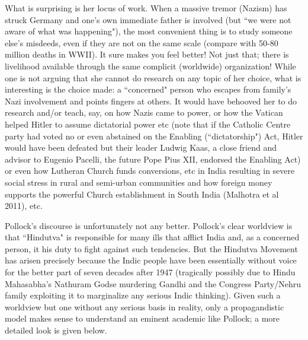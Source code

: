 What is surprising is her locus of work. When a massive tremor (Nazism) has struck Germany and one's own immediate father is involved (but ``we were not aware of what was happening"), the most convenient thing is to study someone else's misdeeds, even if they are not on the same scale (compare with 50-80 million deaths in WWII). It sure makes you feel better! Not just that; there is livelihood available through the same complicit (worldwide) organization! While one is not arguing that she cannot do research on any topic of her choice, what is interesting is the choice made: a ``concerned" person who escapes from family’s Nazi involvement and points fingers at others. It would have behooved her to do research and/or teach, say, on how Nazis came to power, or how the Vatican helped Hitler to assume dictatorial power etc (note that if the Catholic Centre party had voted no or even abstained on the Enabling (``dictatorship") Act, Hitler would have been defeated but their leader Ludwig Kaas, a close friend and advisor to Eugenio Pacelli, the future Pope Pius XII, endorsed the Enabling Act) or even how Lutheran Church funds conversions, etc in India resulting in severe social stress in rural and semi-urban communities and how foreign money supports the powerful Church establishment in South India (Malhotra et al 2011), etc. 

Pollock's discourse is unfortunately not any better. Pollock's clear worldview is that ``Hindutva" is responsible for many ills that afflict India and, as a concerned person, it his duty to fight against such tendencies. But the Hindutva Movement has arisen precisely because the Indic people have been essentially without voice for the better part of seven decades after 1947 (tragically possibly due to Hindu Mahasabha’s Nathuram Godse murdering Gandhi and the Congress Party/Nehru family exploiting it to marginalize any serious Indic thinking).  Given such a worldview but one without any serious basis in reality, only a propagandistic model makes sense to understand an eminent academic like Pollock; a more detailed look is given below.

